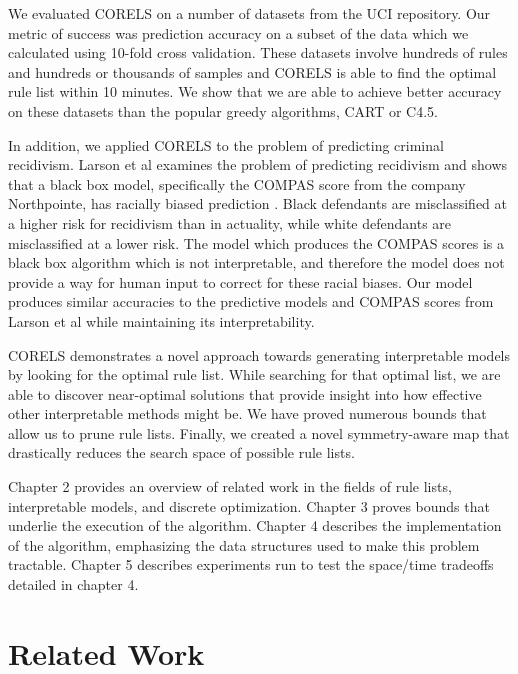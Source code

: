 \documentclass[]{article}
\theoremstyle{definition}
\begin{document}
We evaluated CORELS on a number of datasets from the UCI repository. 
Our metric of success was prediction accuracy on a subset of the data which we calculated using 10-fold cross validation. 
These datasets involve hundreds of rules and hundreds or thousands of samples and CORELS is able to find the optimal rule list within 10 minutes. 
We show that we are able to achieve better accuracy on these datasets than the popular greedy algorithms, CART or C4.5.

In addition, we applied CORELS to the problem of predicting criminal recidivism. 
Larson et al examines the problem of predicting recidivism and shows that a black box model, specifically the COMPAS score from the company Northpointe, has racially biased prediction \cite{LarsonMaKiAn16}.
Black defendants are misclassified at a higher risk for recidivism than in actuality, while white defendants are misclassified at a lower risk. 
The model which produces the COMPAS scores is a black box algorithm which is not interpretable, and therefore the model does not provide a way for human input to correct for these racial biases. 
Our model produces similar accuracies to the predictive models and COMPAS scores from Larson et al while maintaining its interpretability.

CORELS demonstrates a novel approach towards generating interpretable models by looking for the optimal rule list. 
While searching for that optimal list, we are able to discover near-optimal solutions that provide insight into how effective other interpretable methods might be. 
We have proved numerous bounds that allow us to prune rule lists.
Finally, we created a novel symmetry-aware map that drastically reduces the search space of possible rule lists.

Chapter 2 provides an overview of related work in the fields of rule lists, interpretable models, and discrete optimization. 
Chapter 3 proves bounds that underlie the execution of the algorithm.
Chapter 4 describes the implementation of the algorithm, emphasizing the data structures used to make this problem tractable.
Chapter 5 describes experiments run to test the space/time tradeoffs detailed in chapter 4.

\section{Related Work}
\end{document}
